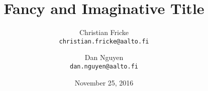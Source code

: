 
\title{Fancy and Imaginative Title}

\author{
  \large Christian Fricke\\[-.2em]
  \texttt{\normalsize christian.fricke@aalto.fi}
  \and
  \large Dan Nguyen\\[-.2em]
  \texttt{\normalsize dan.nguyen@aalto.fi}
}

\date{\large November 25, 2016}

\maketitle

